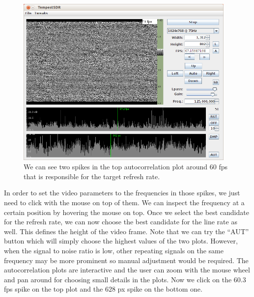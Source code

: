\documentclass[a4paper,12pt,twoside,openright]{report}
\begin{document}
\begin{figure}[h]
\centering
  \includegraphics[width=0.96\textwidth]{demo_firstdetection}
  \caption{We can see two spikes in the top autocorrelation plot around $60$ fps that is responsible for the target refresh rate.}
  \label{fig:demofirst}
\end{figure}

In order to set the video parameters to the frequencies in those spikes, we just need to click with the mouse on top of them. We can inspect the frequency at a certain position by hovering the mouse on top. Once we select the best candidate for the refresh rate, we can now choose the best candidate for the line rate as well. This defines the height of the video frame. Note that we can try the ``AUT'' button which will simply choose the highest values of the two plots. However, when the signal to noise ratio is low, other repeating signals on the same frequency may be more prominent so manual adjustment would be required. The autocorrelation plots are interactive and the user can zoom with the mouse wheel and pan around for choosing small details in the plots. Now we click on the $60.3$ fps spike on the top plot and the $628$ px spike on the bottom one.
\end{document}
